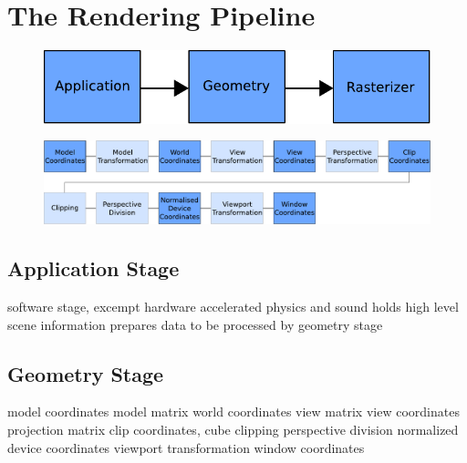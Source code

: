 \section{The Rendering Pipeline}
%
\begin{figure}[h]
\begin{center}
\includegraphics[scale=1.0]{Images/Rendering-Pipeline-AGR.pdf}
\end{center}
\end{figure}
\begin{figure}[t]
\begin{center}
\includegraphics[scale=0.5]{Images/Geometry-Stage.pdf}
\end{center}
\end{figure}
%

\subsection{Application Stage}

software stage, excempt hardware accelerated physics and sound
holds high level scene information
prepares data to be processed by geometry stage

\subsection{Geometry Stage}

model coordinates
model matrix
world coordinates
view matrix
view coordinates
projection matrix
clip coordinates, cube
clipping
perspective division
normalized device coordinates
viewport transformation
window coordinates


